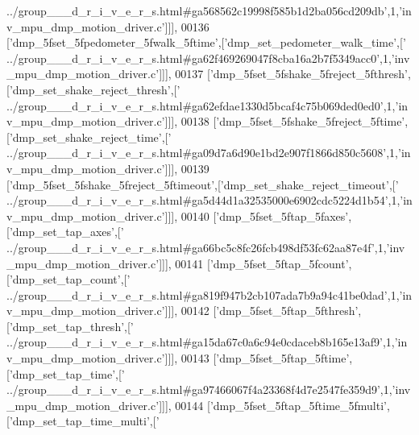 \begin{DoxyCode}
{      ../group\_\_\_d\_r\_i\_v\_e\_r\_s.html#ga568562c19998f585b1d2ba056cd209db'},1,\textcolor{stringliteral}{'inv\_mpu\_dmp\_motion\_driver.c'}]]],
00136   [\textcolor{stringliteral}{'dmp\_5fset\_5fpedometer\_5fwalk\_5ftime'},[\textcolor{stringliteral}{'dmp\_set\_pedometer\_walk\_time'},[\textcolor{stringliteral}{'
      ../group\_\_\_d\_r\_i\_v\_e\_r\_s.html#ga62f469269047f8cba16a2b7f5349acc0'},1,\textcolor{stringliteral}{'inv\_mpu\_dmp\_motion\_driver.c'}]]],
00137   [\textcolor{stringliteral}{'dmp\_5fset\_5fshake\_5freject\_5fthresh'},[\textcolor{stringliteral}{'dmp\_set\_shake\_reject\_thresh'},[\textcolor{stringliteral}{'
      ../group\_\_\_d\_r\_i\_v\_e\_r\_s.html#ga62efdae1330d5bcaf4c75b069ded0ed0'},1,\textcolor{stringliteral}{'inv\_mpu\_dmp\_motion\_driver.c'}]]],
00138   [\textcolor{stringliteral}{'dmp\_5fset\_5fshake\_5freject\_5ftime'},[\textcolor{stringliteral}{'dmp\_set\_shake\_reject\_time'},[\textcolor{stringliteral}{'
      ../group\_\_\_d\_r\_i\_v\_e\_r\_s.html#ga09d7a6d90e1bd2e907f1866d850c5608'},1,\textcolor{stringliteral}{'inv\_mpu\_dmp\_motion\_driver.c'}]]],
00139   [\textcolor{stringliteral}{'dmp\_5fset\_5fshake\_5freject\_5ftimeout'},[\textcolor{stringliteral}{'dmp\_set\_shake\_reject\_timeout'},[\textcolor{stringliteral}{'
      ../group\_\_\_d\_r\_i\_v\_e\_r\_s.html#ga5d44d1a32535000e6902cdc5224d1b54'},1,\textcolor{stringliteral}{'inv\_mpu\_dmp\_motion\_driver.c'}]]],
00140   [\textcolor{stringliteral}{'dmp\_5fset\_5ftap\_5faxes'},[\textcolor{stringliteral}{'dmp\_set\_tap\_axes'},[\textcolor{stringliteral}{'
      ../group\_\_\_d\_r\_i\_v\_e\_r\_s.html#ga66bc5c8fc26fcb498df53fc62aa87e4f'},1,\textcolor{stringliteral}{'inv\_mpu\_dmp\_motion\_driver.c'}]]],
00141   [\textcolor{stringliteral}{'dmp\_5fset\_5ftap\_5fcount'},[\textcolor{stringliteral}{'dmp\_set\_tap\_count'},[\textcolor{stringliteral}{'
      ../group\_\_\_d\_r\_i\_v\_e\_r\_s.html#ga819f947b2cb107ada7b9a94c41be0dad'},1,\textcolor{stringliteral}{'inv\_mpu\_dmp\_motion\_driver.c'}]]],
00142   [\textcolor{stringliteral}{'dmp\_5fset\_5ftap\_5fthresh'},[\textcolor{stringliteral}{'dmp\_set\_tap\_thresh'},[\textcolor{stringliteral}{'
      ../group\_\_\_d\_r\_i\_v\_e\_r\_s.html#ga15da67c0a6c94e0cdaceb8b165e13af9'},1,\textcolor{stringliteral}{'inv\_mpu\_dmp\_motion\_driver.c'}]]],
00143   [\textcolor{stringliteral}{'dmp\_5fset\_5ftap\_5ftime'},[\textcolor{stringliteral}{'dmp\_set\_tap\_time'},[\textcolor{stringliteral}{'
      ../group\_\_\_d\_r\_i\_v\_e\_r\_s.html#ga97466067f4a23368f4d7e2547fe359d9'},1,\textcolor{stringliteral}{'inv\_mpu\_dmp\_motion\_driver.c'}]]],
00144   [\textcolor{stringliteral}{'dmp\_5fset\_5ftap\_5ftime\_5fmulti'},[\textcolor{stringliteral}{'dmp\_set\_tap\_time\_multi'},[\textcolor{stringliteral}{'
}
\end{DoxyCode}
